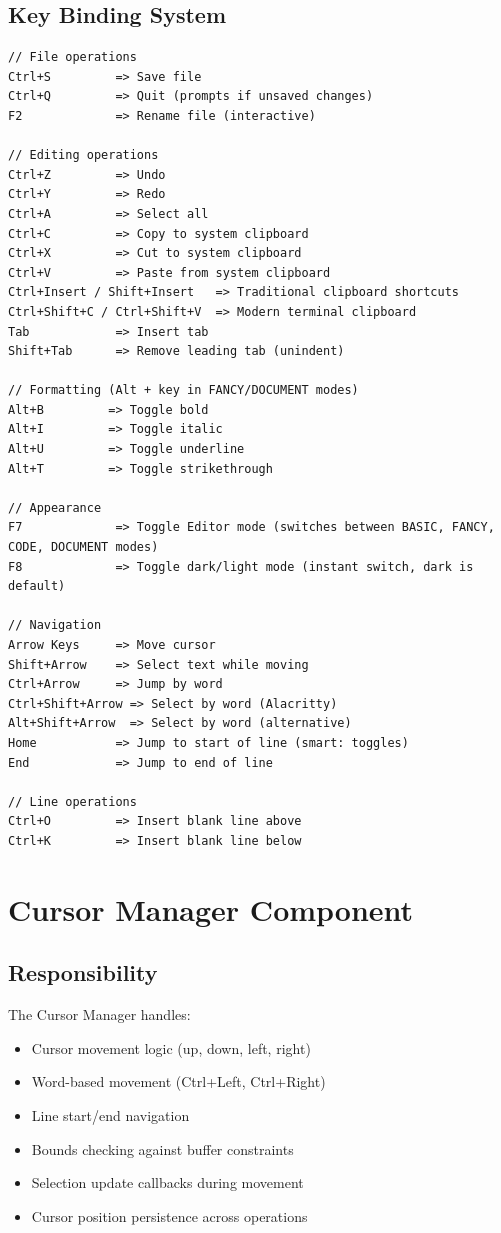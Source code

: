 \documentclass[12pt,a4paper,oneside,openany]{report}
\begin{document}
\subsection{Key Binding System}
\begin{lstlisting}
// File operations
Ctrl+S         => Save file
Ctrl+Q         => Quit (prompts if unsaved changes)
F2             => Rename file (interactive)

// Editing operations
Ctrl+Z         => Undo
Ctrl+Y         => Redo
Ctrl+A         => Select all
Ctrl+C         => Copy to system clipboard
Ctrl+X         => Cut to system clipboard
Ctrl+V         => Paste from system clipboard
Ctrl+Insert / Shift+Insert   => Traditional clipboard shortcuts
Ctrl+Shift+C / Ctrl+Shift+V  => Modern terminal clipboard
Tab            => Insert tab
Shift+Tab      => Remove leading tab (unindent)

// Formatting (Alt + key in FANCY/DOCUMENT modes)
Alt+B         => Toggle bold
Alt+I         => Toggle italic
Alt+U         => Toggle underline
Alt+T         => Toggle strikethrough

// Appearance
F7			   => Toggle Editor mode (switches between BASIC, FANCY, CODE, DOCUMENT modes)
F8             => Toggle dark/light mode (instant switch, dark is default)

// Navigation
Arrow Keys     => Move cursor
Shift+Arrow    => Select text while moving
Ctrl+Arrow     => Jump by word
Ctrl+Shift+Arrow => Select by word (Alacritty)
Alt+Shift+Arrow  => Select by word (alternative)
Home           => Jump to start of line (smart: toggles)
End            => Jump to end of line

// Line operations
Ctrl+O         => Insert blank line above
Ctrl+K         => Insert blank line below
\end{lstlisting}

\section{Cursor Manager Component}

\subsection{Responsibility}

The Cursor Manager handles:

\begin{itemize}
	\item Cursor movement logic (up, down, left, right)
	\item Word-based movement (Ctrl+Left, Ctrl+Right)
	\item Line start/end navigation
	\item Bounds checking against buffer constraints
	\item Selection update callbacks during movement
	\item Cursor position persistence across operations
\end{itemize}
\end{document}

